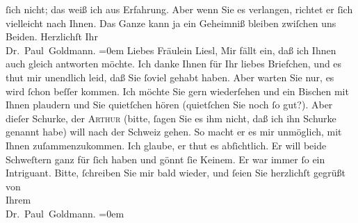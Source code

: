\begin{ledgroupsized}[t]{13cm}
               ſich nicht; das weiß ich aus Erfahrung. Aber wenn Sie es verlangen, richtet er ſich
               vielleicht nach Ihnen. Das Ganze kann ja ein Geheimniß bleiben zwiſchen uns  Beiden.\pend
           \pstart
           Herzlichſt Ihr {\\[\baselineskip]}\spacefill\mbox{Dr. Paul Goldmann.}\pend
           \leftskip=0em{}{\bigskip}\pstart
           \noindent{}{\pb}Liebes Fräulein Liesl,\pend
           \pstart
           Mir fällt ein, daß ich Ihnen auch gleich antworten möchte. Ich danke Ihnen für Ihr
               liebes Briefchen, und es thut mir unendlich leid, daß Sie ſoviel \label{K_L03071-3v}\label{K_L03071-3h} gehabt
               haben. Aber warten Sie nur, es wird ſchon beſſer kommen. Ich möchte Sie gern
               wiederſehen und ein Bischen mit Ihnen plaudern und Sie quietſchen hören (quietſchen
               Sie noch ſo gut?). Aber dieſer {\pb}Schurke, der \textsc{Arthur} (bitte,  ſagen Sie es ihm \strikeout{\textcolor{gray}{×}\-\textcolor{gray}{×}\-\textcolor{gray}{×}} nicht, daß ich ihn Schurke genannt habe) will nach der Schweiz gehen. So macht er es mir unmöglich, mit Ihnen
               zuſammenzukommen. Ich glaube, er thut es abſichtlich. Er will beide Schweſtern ganz
               für ſich haben und gönnt ſie Keinem. Er war immer ſo ein Intriguant.\pend
           \pstart
           {\pb}Bitte, ſchreiben Sie mir bald wieder, und ſeien Sie
               herzlichſt gegrüßt von {\\[\baselineskip]}Ihrem {\\[\baselineskip]}\spacefill\mbox{Dr. Paul Goldmann.}\pend
           \leftskip=0em{}
         
         \endnumbering{}\end{ledgroupsized}  \newcommand{\dateiname}{L03071}\newcommand{\titel}{Paul Goldmann an Arthur Schnitzler, Olga und Elisabeth Gussmann, 3. 7. [1901]}\newcommand{\editorInnen}{Martin Anton Müller und Laura Untner}
      